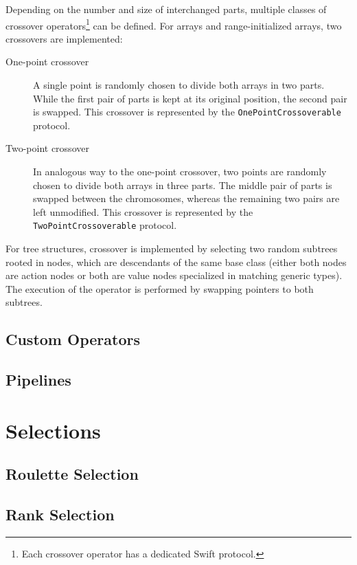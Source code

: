 Depending on the number and size of interchanged parts, multiple classes of crossover operators\footnote{Each crossover operator has a dedicated Swift protocol.} can be defined. For arrays and range-initialized arrays, two crossovers are implemented:
~
\begin{description}
	\item[One-point crossover]
	A single point is randomly chosen to divide both arrays in two parts. While the first pair of parts is kept at its original position, the second pair is swapped. This crossover is represented by the \texttt{OnePointCrossoverable} protocol.

	\item[Two-point crossover]
	In analogous way to the one-point crossover, two points are randomly chosen to divide both arrays in three parts. The middle pair of parts is swapped between the chromosomes, whereas the remaining two pairs are left unmodified. This crossover is represented by the \texttt{TwoPointCrossoverable} protocol.
\end{description}

For tree structures, crossover is implemented by selecting two random subtrees rooted in nodes, which are descendants of the same base class (either both nodes are action nodes or both are value nodes specialized in matching generic types). The execution of the operator is performed by swapping pointers to both subtrees.

\subsection{Custom Operators}



\subsection{Pipelines}\label{section:pipelines}
\todo

\section{Selections}\label{section:selection}
\todo

\subsection{Roulette Selection}
\todo

\subsection{Rank Selection}
\todo


